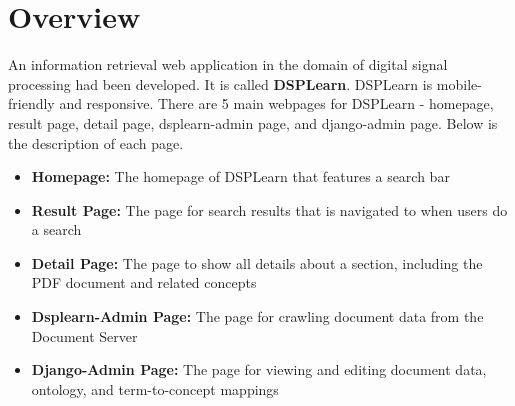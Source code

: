 \section{Overview}
An information retrieval web application in the domain of digital signal processing had been developed. It is called \textbf{DSPLearn}. DSPLearn is mobile-friendly and responsive. There are 5 main webpages for DSPLearn - homepage, result page, detail page, dsplearn-admin page, and django-admin page. Below is the description of each page. 
\begin{itemize}
\item \textbf{Homepage:} The homepage of DSPLearn that features a search bar
\item \textbf{Result Page:} The page for search results that is navigated to when users do a search
\item \textbf{Detail Page:} The page to show all details about a section, including the PDF document and related concepts
\item \textbf{Dsplearn-Admin Page:} The page for crawling document data from the Document Server
\item \textbf{Django-Admin Page:} The page for viewing and editing document data, ontology, and term-to-concept mappings
\end{itemize}